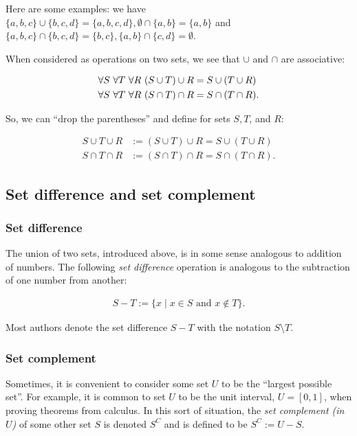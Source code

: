Here are some examples: we have $\{a, b, c\} \cup \{b, c, d\} = \{a, b, c, d\}, \emptyset \cap \{a, b\} = \{a, b\}$ and $\{a, b, c\} \cap \{b, c, d\} = \{b, c\}, \{a, b\} \cap \{c, d\} = \emptyset$.

When considered as operations on two sets, we see that $\cup$ and $\cap$ are associative:

\begin{align*}
    \forall S \text{ } \forall T \text{ } \forall R \text{ } (S \cup T) \cup R &= S \cup (T \cup R) \\
    \forall S \text{ } \forall T \text{ } \forall R \text{ } (S \cap T) \cap R &= S \cap (T \cap R).
\end{align*}

So, we can ``drop the parentheses'' and define for sets $S, T$, and $R$:

\begin{align*}
    S \cup T \cup R &:= (S \cup T) \cup R = S \cup (T \cup R) \\
    S \cap T \cap R &:= (S \cap T) \cap R = S \cap (T \cap R).
\end{align*}

\subsection*{Set difference and set complement}

\subsubsection*{Set difference}

The union of two sets, introduced above, is in some sense analogous to addition of numbers. The following \textit{set difference} operation is analogous to the subtraction of one number from another:

\begin{align*}
    S - T := \{ x \mid x \in S \text{ and } x \notin T \}.
\end{align*}

Most authors denote the set difference $S - T$ with the notation $S \setminus T$.

\subsubsection*{Set complement}

Sometimes, it is convenient to consider some set $U$ to be the ``largest possible set''. For example, it is common to set $U$ to be the unit interval, $U = [0, 1]$, when proving theorems from calculus. In this sort of situation, the \textit{set complement (in $U$)} of some other set $S$ is denoted $S^C$ and is defined to be $S^C := U - S$.

